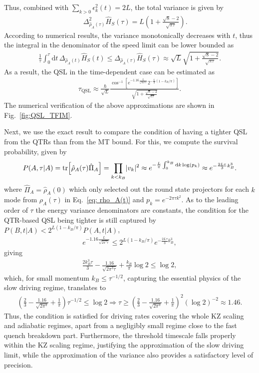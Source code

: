 \documentclass[prl,aps,amssymb,twocolumn,superscriptaddress, notitlepage, longbibliography]{revtex4-2}
\begin{document}
Thus, combined with $\sum_{k>0}\epsilon^2_k(t)=2L$, the total variance is given by
\begin{eqnarray}
    &&\Delta^2_{\hat\rho_A(\tau)}\hat H_S(\tau)=L\left(1+\frac{\sqrt8-2}{\sqrt{\pi\tau}}\right).
\end{eqnarray}
According to numerical results, the variance monotonically decreases with $t$, thus the integral in the denominator of the speed limit can be lower bounded as
\begin{eqnarray}
    \frac{1}{\tau}\int_0^\tau\mathrm dt\,\Delta_{\hat\rho_A(t)}\hat H_S(t)\leq\Delta_{\hat\rho_A(\tau)}\hat H_S(\tau)\approx \sqrt L\sqrt{1+\frac{\sqrt8-2}{\sqrt{\pi\tau}}}.
\end{eqnarray}
As a result, the QSL in the time-dependent case can be estimated as
\begin{eqnarray}
\tau_\mathrm{QSL}\approx\frac{\hbar}{\sqrt L}\frac{\cos^{-1}\left[e^{-1.16\frac{L}{\sqrt{8\pi^3 \tau}}}2^{-\frac{L}{2}(1-k_B/\pi)}\right]}{\sqrt{1+\frac{\sqrt8-2}{\sqrt{\pi\tau}}}}.
\end{eqnarray}
The numerical verification of the above approximations are shown in Fig.~\ref{fig:QSL_TFIM}.

Next, we use the exact result to compare the condition of having a tighter QSL from the QTRs than from the MT bound. For this, we compute the survival probability, given by
\begin{eqnarray}
    P(A,\tau\vert A)=\tr[\hat\rho_A(\tau)\hat\Pi_A]=\prod_{k<k_B}\lvert v_k\rvert^2\approx e^{-\frac{L}{\pi}\int_0^{k_B}\mathrm dk \log(p_k)}\approx e^{-\frac{2L\tau}{3}k^3_B}.
\end{eqnarray}
where $\hat\Pi_A=\hat\rho_A(0)$ which only selected out the round state projectors for each $k$ mode from $\rho_A(\tau)$ in Eq.~\eqref{eq: rho_A(t)} and $p_k=e^{-2\pi \tau k^2}$. As to the leading order of $\tau$ the energy variance denominators are constants,
the condition for the QTR-based QSL being tighter is still captured by $P(B,t\vert A)<2^{L(1-k_B/\pi)}P(A,t\vert A)$,
\begin{eqnarray}
    e^{-1.16 \frac{L}{\sqrt{2\pi^3 \tau}}}\leq 2^{L(1-k_B/\pi)}e^{-\frac{2L\tau}{3}k^3_B},
\end{eqnarray}
giving
\begin{eqnarray}
    \frac{2k^3_B\tau}{3}-\frac{1.16}{\sqrt{2\pi^3\tau}}+\frac{k_B}{\pi}\log 2\leq\log 2 ,
\end{eqnarray}
which, for small momentum $k_B\leq \tau^{-1/2}$, capturing the essential physics of the slow driving regime, translates to
\begin{eqnarray}
    \left(\frac{2}{3}-\frac{1.16}{\sqrt{2\pi^3}}+\frac{1}{\pi}\right)\tau^{-1/2}\leq \log 2\Rightarrow \tau\geq \left(\frac{2}{3}-\frac{1.16}{\sqrt{2\pi^3}}+\frac{1}{\pi}\right)^{2}(\log2)^{-2}\approx 1.46.
\end{eqnarray}
Thus, the condition is satisfied for driving rates covering the whole KZ scaling and adiabatic regimes, apart from a negligibly small regime close to the fast quench breakdown part. Furthermore, the threshold timescale falls properly within the KZ scaling regime, justifying the approximation of the slow driving limit, while the approximation of the variance also provides a satisfactory level of precision.
\end{document}
